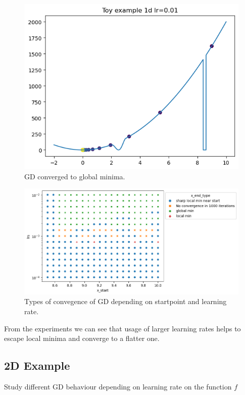 \documentclass{article}
\theoremstyle{definition}
\begin{document}
\begin{figure}[!htb]
      \includegraphics[width=\linewidth]{1d_example_global_min.png}
      \caption{GD converged to global minima.}
    \endminipage
\end{figure}

\begin{figure}[!htb]
    \begin{center}
        \caption{Types of convegence of GD depending on startpoint and learning rate.}
        \includegraphics[scale=0.7]{1d_learning_rate_stats.png}        
    \end{center}
\end{figure}

From the experiments we can see that usage of larger learning rates
helps to escape local minima and converge to a flatter one.

\clearpage

\subsection{2D Example}
Study different GD behaviour depending on learning rate on
the function $f$
\end{document}

